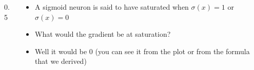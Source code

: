 \begin{frame}
	\begin{columns}
		\begin{column} {0.5\textwidth}
			
			\begin{center}
				
			\end{center}
			
		\end{column}
		\begin{column}{0.5\textwidth}
			\begin{itemize}
				\justifying
				\item<1-> A sigmoid neuron is said to have saturated when $\sigma(x)=1$ or $\sigma(x)=0$
				\item<2-> What would the gradient be at saturation?
				\item<3-> Well it would be 0 (you can see it from the plot or from the formula that we derived)
			\end{itemize}
			
		\end{column}
		
	\end{columns}
\end{frame}


